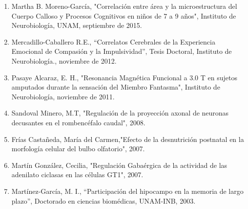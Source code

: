 \begin{enumerate}
\item Martha B. Moreno-García, "Correlación entre área y la microestructura del Cuerpo Calloso y Procesos Cognitivos en niños de 7 a 9 años", Instituto de 
Neurobiología, UNAM,  septiembre de 2015.

\item Mercadillo-Caballero R.E., “Correlatos Cerebrales de la Experiencia Emocional de Compasión y la Impulsividad”, Tesis Doctoral, Instituto de 
Neurobiología.,  
noviembre de 2012.

\item Pasaye Alcaraz, E. H., "Resonancia Magnética Funcional a 3.0 T en sujetos amputados durante la sensación del Miembro Fantasma", Instituto de 
Neurobiología,  
noviembre de 2011.

\item Sandoval Minero, M.T, "Regulación de la proyección axonal de neuronas decusantes en el rombencéfalo caudal",  2008.

\item Frías Castañeda, María del Carmen,"Efecto de la desnutrición postnatal en la morfología celular del bulbo olfatorio",  2007.

\item Martín González, Cecilia, "Regulación Gabaérgica de la actividad de las adenilato ciclasas en las células GT1",  2007.

\item Martínez-García, M. I., “Participación del hipocampo en la memoria de largo plazo”, Doctorado en ciencias biomédicas, UNAM-INB,  2003.

\end{enumerate}

